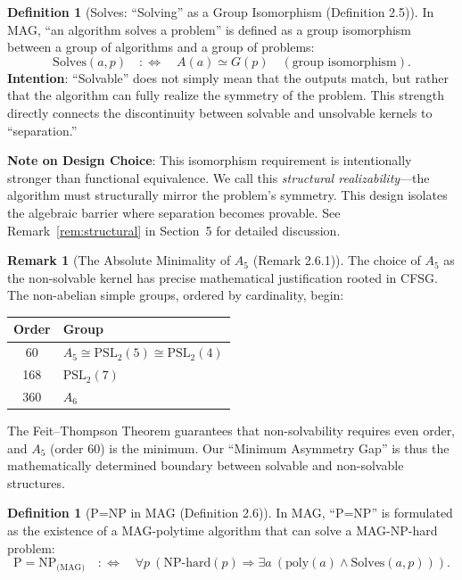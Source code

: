 \documentclass[11pt,a4paper]{article}
\theoremstyle{plain}
\theoremstyle{definition}
\newtheorem{definition}[theorem]{Definition}
\newtheorem{remark}[theorem]{Remark}
\newcommand{\Solves}{\mathrm{Solves}}
\begin{document}
\begin{definition}[Solves: ``Solving'' as a Group Isomorphism (Definition 2.5)]
In MAG, ``an algorithm solves a problem'' is defined as a group isomorphism between a group of algorithms and a group of problems:
\[
\Solves(a,p) \quad :\Longleftrightarrow \quad A(a) \simeq G(p) \quad (\text{group isomorphism}).
\]
\textbf{Intention}: ``Solvable'' does not simply mean that the outputs match, but rather that the algorithm can fully realize the symmetry of the problem. This strength directly connects the discontinuity between solvable and unsolvable kernels to ``separation.''

\textbf{Note on Design Choice}: This isomorphism requirement is intentionally stronger than functional equivalence. We call this \emph{structural realizability}---the algorithm must structurally mirror the problem's symmetry. This design isolates the algebraic barrier where separation becomes provable. See Remark~\ref{rem:structural} in Section~5 for detailed discussion.
\end{definition}

\begin{remark}[The Absolute Minimality of $A_5$ (Remark 2.6.1)]
The choice of $A_5$ as the non-solvable kernel has precise mathematical justification 
rooted in CFSG. The non-abelian simple groups, ordered by cardinality, begin:
\begin{center}
\begin{tabular}{cl}
\textbf{Order} & \textbf{Group} \\
\hline
60  & $A_5 \cong \mathrm{PSL}_2(5) \cong \mathrm{PSL}_2(4)$ \\
168 & $\mathrm{PSL}_2(7)$ \\
360 & $A_6$ \\
\end{tabular}
\end{center}
The Feit--Thompson Theorem guarantees that non-solvability requires even order, 
and $A_5$ (order 60) is the minimum. Our ``Minimum Asymmetry Gap'' is thus the 
mathematically determined boundary between solvable and non-solvable structures.
\end{remark}



\begin{definition}[P=NP in MAG (Definition 2.6)]
In MAG, ``P=NP'' is formulated as the existence of a MAG-polytime algorithm that can solve a MAG-NP-hard problem:
\[
\mathrm{P}=\mathrm{NP}_{\text{(MAG)}} \quad :\Longleftrightarrow \quad \forall p\ (\text{NP-hard}(p) \Rightarrow \exists a\ (\text{poly}(a) \wedge \Solves(a,p))).
\]
\end{definition}
\end{document}
